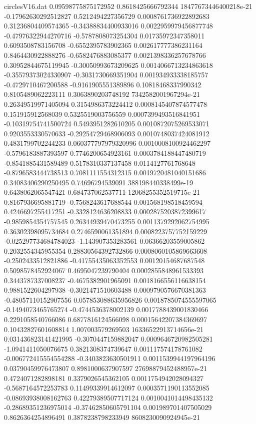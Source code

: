 \begin{filecontents}{circlesV16.dat}
0.09598775875172952	0.8618425666792344	18477673446400218e-21
-0.17962630292512827	0.5212494227356729	0.0008761736922892683
0.31236804409574365	-0.34388834400933016	0.0022959979456877748
-0.47976322944270716	-0.5787808073254304	0.01735972347358011
0.6093508783156708	-0.6552395783902365	0.002617777386231164
0.8464430922888276	-0.6582476883085377	0.0021398336257678766
0.30952844675119945	-0.30050993673209625	0.0014066713234863618
-0.35579373024330907	-0.3031730669351904	0.001934933338185757
-0.4729710467200588	-0.9161905551389896	0.10818468337990342
0.8105489062223111	0.3063890203748192	7342582001967294e-21
0.26349519971405094	0.3154986373224412	0.0008145407874577478
0.151915912568039	0.5325519003756559	0.0007399493516841951
-0.10319754741500724	0.5493951282610205	0.0010872075269533071
0.9203553330570633	-0.29254729468906093	0.0010748037424081912
0.4831799702244233	0.060377797979320996	0.0010008100924462297
-0.5796183887393597	0.7746200654923161	0.0003784188447480719
-0.8541885431589489	0.5178310337137458	0.0114127761768648
-0.8796583444738513	0.7081111554312315	0.0019720481040151686
0.34083406290250495	0.74696794539091	388198440338499e-19
0.6438062065547421	0.684737062537711	12068255352519715e-21
0.8167936695881719	-0.7568243617688544	0.001568198518459594
0.4246697255417251	-0.3328124636208833	0.0002875203872399617
-0.9859854354757545	0.26344939470473255	0.0011379292062754995
0.36302398095734684	0.2746590061351894	0.0008223757752159229
-0.025297734684784023	-1.143907353283561	0.06366203559005862
0.2032554345955354	0.28830564392732866	0.0008060105869663608
-0.2502433512821886	-0.41755435063352553	0.00120154687687548
0.5098578452924067	0.4695047239790404	0.0002855848961533393
0.3443787337008237	-0.4675382901965091	0.0018166556116638154
0.9881522604297938	-0.3021471510603488	0.0009790576670381363
-0.48057110152907556	0.057853088635956826	0.0018785074555597065
-0.1494073465765274	-0.4744536378002139	0.0017788439001830466
0.2291058540766086	0.6877816124566098	0.00015642207384369697
0.10432827601608814	1.007003579269503	16336522913714656e-21
0.031436823141421995	-0.3070447159882047	0.0009646720982505281
-1.0941411050076675	0.3821308374739647	0.001117574178761082
-0.006772415554554288	-0.3403823630501911	0.0011539944197964196
0.03790459976473807	0.8981000637907597	27698879452488957e-21
0.4724071282898181	0.3379026545362105	0.0011754942028094327
-0.5687164572253783	0.11499339914612097	0.0003571190113552085
-0.08693938008162763	0.42279389507717124	0.0010041014498435132
-0.28689351236975014	-0.37462850605791104	0.001989701407505029
0.8626364254896491	0.3878238798233949	8608230090924945e-21

\end{filecontents}
